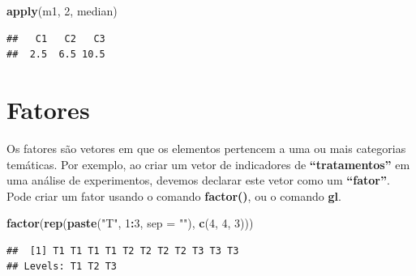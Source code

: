 \documentclass[
]{book}
\newenvironment{Shaded}{\begin{snugshade}}{\end{snugshade}}
\newcommand{\DataTypeTok}[1]{\textcolor[rgb]{0.13,0.29,0.53}{#1}}
\newcommand{\DecValTok}[1]{\textcolor[rgb]{0.00,0.00,0.81}{#1}}
\newcommand{\KeywordTok}[1]{\textcolor[rgb]{0.13,0.29,0.53}{\textbf{#1}}}
\newcommand{\NormalTok}[1]{#1}
\newcommand{\OperatorTok}[1]{\textcolor[rgb]{0.81,0.36,0.00}{\textbf{#1}}}
\newcommand{\StringTok}[1]{\textcolor[rgb]{0.31,0.60,0.02}{#1}}
\begin{document}
\begin{Shaded}
\begin{Highlighting}[]
 \KeywordTok{apply}\NormalTok{(m1, }\DecValTok{2}\NormalTok{, median)}
\end{Highlighting}
\end{Shaded}

\begin{verbatim}
##   C1   C2   C3 
##  2.5  6.5 10.5
\end{verbatim}

\hypertarget{fatores}{%
\section{Fatores}\label{fatores}}

Os fatores são vetores em que os elementos pertencem a uma ou mais categorias temáticas. Por exemplo, ao criar um vetor de indicadores de \textbf{``tratamentos''} em uma análise de experimentos, devemos declarar este vetor como um \textbf{``fator''}.
Pode criar um fator usando o comando \textbf{factor()}, ou o comando \textbf{gl}.

\begin{Shaded}
\begin{Highlighting}[]
\KeywordTok{factor}\NormalTok{(}\KeywordTok{rep}\NormalTok{(}\KeywordTok{paste}\NormalTok{(}\StringTok{"T"}\NormalTok{, }\DecValTok{1}\OperatorTok{:}\DecValTok{3}\NormalTok{, }\DataTypeTok{sep =} \StringTok{""}\NormalTok{), }\KeywordTok{c}\NormalTok{(}\DecValTok{4}\NormalTok{, }\DecValTok{4}\NormalTok{, }\DecValTok{3}\NormalTok{)))}
\end{Highlighting}
\end{Shaded}

\begin{verbatim}
##  [1] T1 T1 T1 T1 T2 T2 T2 T2 T3 T3 T3
## Levels: T1 T2 T3
\end{verbatim}
\end{document}
